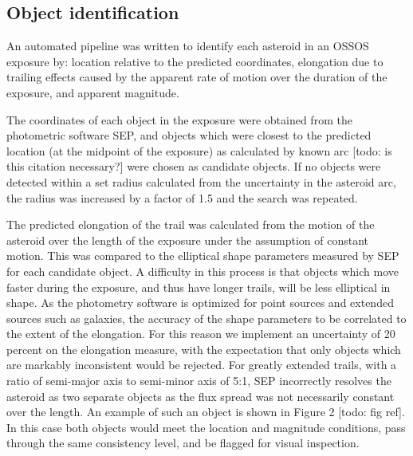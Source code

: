 \documentclass[iop,apj]{emulateapj}
\begin{document}
\subsection{Object identification}

An automated pipeline was written to identify each asteroid in an OSSOS exposure by: location relative to the predicted coordinates,  elongation due to trailing effects caused by the apparent rate of motion over the duration of the exposure, and apparent magnitude. 

The coordinates of each object in the exposure were obtained from the photometric software SEP, and objects which were closest to the predicted location (at the midpoint of the exposure) as calculated by known arc \citep{jpl} [todo: is this citation necessary?] were chosen as candidate objects. If no objects were detected within a set radius calculated from the uncertainty in the asteroid arc, the radius was increased by a factor of 1.5 and the search was repeated.

The predicted elongation of the trail was calculated from the motion of the asteroid over the length of the exposure \citep{jpl} under the assumption of constant motion. This was compared to the elliptical shape parameters measured by SEP for each candidate object. 
A difficulty in this process is that objects which move faster during the exposure, and thus have longer trails, will be less elliptical in shape. As the photometry software is optimized for point sources and extended sources such as galaxies, the accuracy of the shape parameters to be correlated to the extent of the elongation. For this reason we implement an uncertainty of 20 percent on the elongation measure, with the expectation that only objects which are markably inconsistent would be rejected. For greatly extended trails, with a ratio of semi-major axis to semi-minor axis of 5:1, SEP incorrectly resolves the asteroid as two separate objects as the flux spread was not necessarily constant over the length. An example of such an object is shown in Figure 2 [todo: fig ref]. In this case both objects would meet the location and magnitude conditions, pass through the same consistency level, and be flagged for visual inspection.
\end{document}
